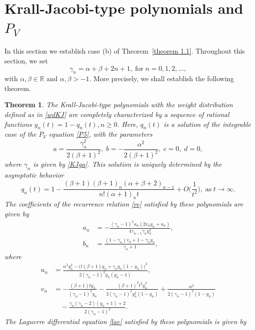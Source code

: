 \documentclass[10pt, reqno]{amsart}
\numberwithin{equation}{section}
\newtheorem{theorem}{Theorem}[section]
\numberwithin{equation}{section}
\begin{document}
\section{Krall-Jacobi-type polynomials and $P_V$}
In this section we establish case (b) of Theorem~\ref{theorem 1.1}. Throughout this section, we set
\begin{equation}
\gamma_n=\alpha+\beta+2n+1,\;\mbox{for}\; n=0,1,2,\ldots, \label{KJga}
\end{equation}
with $\alpha, \beta \in \mathbb{R}$ and $\alpha, \beta>-1$. More precisely, we shall establish the following theorem.
\begin{theorem} \label{theorem 4.1} 
The Krall-Jacobi-type polynomials with the weight distribution defined as in \eqref{wdKJ} are completely characterized by a sequence of rational functions $y_n(t)=1-q_n(t), n\geq 0$. Here, $q_n(t)$ is a solution of the integrable case of the $P_{V}$ equation \eqref{P5}, with the parameters 
\begin{equation}
a=\frac{\gamma_n^2}{2(\beta+1)^2},\;b=-\frac{\alpha^2}{2(\beta+1)^2},\;c=0,\;d=0, \label{KJP5}
\end{equation}
where $\gamma_n$ is given by \eqref{KJga}. This solution is uniquely determined by the asymptotic behavior
\begin{equation}
q_n(t)=1-\frac{(\beta+1)(\beta+1)_n(\alpha+\beta+2)_{n-1}}{n!(\alpha+1)_n t}+O\Big(\frac{1}{t^2}\Big),\;\mbox{as}\;t\to \infty.\label{aKJP5}
\end{equation}
The coefficients of the recurrence relation \eqref{re} satisfied by these polynomials are given by
\begin{align}
a_n&=-\frac{(\gamma_n-1)^2u_n(2v_ny_n+u_n)}{4\gamma_{n-1}\gamma_n y_n^2},\label{KJrea}\\
b_n&=\frac{(1-\gamma_n)v_n+1-\gamma_ny_n}{\gamma_n+1}\label{KJreb},
\end{align}
where 
\begin{align}
u_n&=\frac{\alpha^2y_n^2-\big(t(\beta+1)\dot{y}_n+\gamma_ny_n(1-y_n)\big)^2}{2(\gamma_n-1)^2y_n(y_n-1)},\label{KJuy}\\
v_n&=-\frac{(\beta+1)t\dot{y}_n}{(\gamma_n-1)^2y_n}-\frac{(\beta+1)^2t^2\dot{y}_n^2}{2(\gamma_n-1)^2y_n^2(1-y_n)}+\frac{\alpha^2}{2(\gamma_n-1)^2(1-y_n)}\nonumber\\
&\quad -\frac{\gamma_n(\gamma_n-2)(y_n+1)+2}{2(\gamma_n-1)^2}\label{KJvy}.
\end{align}
The Laguerre differential equation \eqref{lae} satisfied by these polynomials is given by
\begin{multline} \label{KJde}

\end{multline}
\end{theorem}
\end{document}
